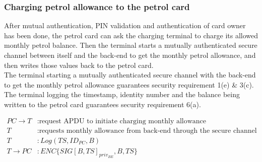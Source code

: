 \subsubsection{Charging petrol allowance to the petrol card}
After mutual authentication, PIN validation and authentication of card owner
has been done, the petrol card can ask the charging terminal to charge its
allowed monthly petrol balance. Then the terminal starts a mutually
authenticated secure channel between itself and the back-end to get the monthly petrol allowance, and then
writes those values back to the petrol card.\\

The terminal starting a mutually authenticated secure channel with the back-end to get the monthly petrol allowance guarantees security requirement 1(e) \& 3(c).\\

The terminal logging the timestamp, identity number and the balance being written to the petrol card guarantees security requirement 6(a).

\begin{equation}\nonumber
\begin{split}
PC \to T&: \text{request APDU to initiate charging monthly allowance} \\
    T&: \text{requests monthly allowance from back-end through the secure channel} \\
T&: Log(TS, ID_{PC}, B) \\
T \to PC&: ENC\{SIG[B,TS]_{priv_{BE}}, B, TS\}
\end{split} 
\end{equation}
